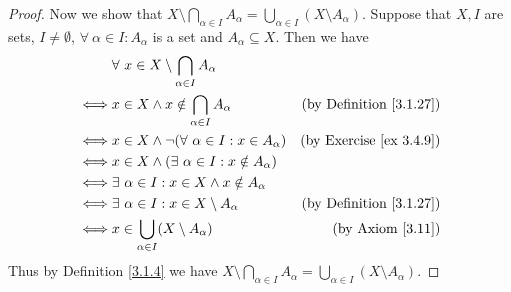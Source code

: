 \begin{proof}
Now we show that \(X \setminus \bigcap_{\alpha \in I} A_{\alpha} = \bigcup_{\alpha \in I} (X \setminus A_{\alpha})\).
Suppose that \(X, I\) are sets, \(I \neq \emptyset\), \(\forall\ \alpha \in I : A_{\alpha}\) is a set and \(A_{\alpha} \subseteq X\).
Then we have
\begin{align*}
& \forall\ x \in X \setminus \bigcap_{\alpha \in I} A_{\alpha} \\
\iff & x \in X \land x \notin \bigcap_{\alpha \in I} A_{\alpha} & \text{(by Definition \ref{3.1.27})} \\
\iff & x \in X \land \lnot(\forall\ \alpha \in I : x \in A_{\alpha}) & \text{(by Exercise \ref{ex 3.4.9})} \\
\iff & x \in X \land (\exists\ \alpha \in I : x \notin A_{\alpha}) \\
\iff & \exists\ \alpha \in I : x \in X \land x \notin A_{\alpha} \\
\iff & \exists\ \alpha \in I : x \in X \setminus A_{\alpha} & \text{(by Definition \ref{3.1.27})} \\
\iff & x \in \bigcup_{\alpha \in I} (X \setminus A_{\alpha}) & \text{(by Axiom \ref{3.11})} \\
\end{align*}
Thus by Definition \ref{3.1.4} we have \(X \setminus \bigcap_{\alpha \in I} A_{\alpha} = \bigcup_{\alpha \in I} (X \setminus A_{\alpha})\).
\end{proof}